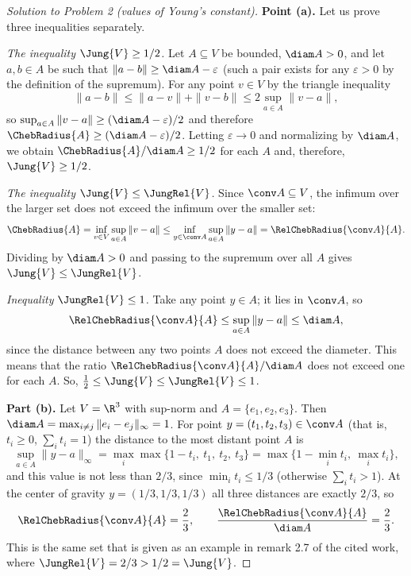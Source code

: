 \documentclass[a4paper,12pt]{report}
\begin{document}
\begin{proof}[Solution to Problem \textup{2} \textup{(}values of Young's constant\textup{)}]

\textbf{Point \textup{(a)}.} Let us prove three inequalities separately.

\textit{The inequality $\Jung{V} \ge 1/2$.} Let $A \subseteq V$ be bounded, $\diam A > 0$, and let $a, b \in A$ be such that $\|a - b\| \ge \diam A - \varepsilon$ \textup{(}such a pair exists for any $\varepsilon > 0$ by the definition of the supremum\textup{)}. For any point $v \in V$ by the triangle inequality
\[
\|a - b\| \le \|a - v\| + \|v - b\| \le 2 \sup_{a \in A} \|v - a\|,
\]
so $\sup_{a \in A} \|v - a\| \ge (\diam A - \varepsilon)/2$ and therefore $\ChebRadius{A} \ge (\diam A - \varepsilon)/2$. Letting $\varepsilon \to 0$ and normalizing by $\diam A$, we obtain $\ChebRadius{A}/\diam A \ge 1/2$ for each $A$ and, therefore, $\Jung{V} \ge 1/2$.

\textit{The inequality $\Jung{V} \le \JungRel{V}$.} Since $\conv A \subseteq V$, the infimum over the larger set does not exceed the infimum over the smaller set:
\[
\ChebRadius{A} = \inf_{v \in V} \sup_{a \in A} \|v - a\| \le \inf_{y \in \conv A} \sup_{a \in A} \|y - a\| = \RelChebRadius{\conv A}{A}.
\]
Dividing by $\diam A > 0$ and passing to the supremum over all $A$ gives $\Jung{V} \le \JungRel{V}$.

\textit{Inequality $\JungRel{V} \le 1$.} Take any point $y \in A$; it lies in $\conv A$, so
\[
\RelChebRadius{\conv A}{A} \le \sup_{a \in A} \|y - a\| \le \diam A,
\]
since the distance between any two points $A$ does not exceed the diameter. This means that the ratio $\RelChebRadius{\conv A}{A}/\diam A$ does not exceed one for each $A$. So, $\frac12 \le \Jung{V} \le \JungRel{V} \le 1$.

\textbf{Part \textup{(b)}.} Let $V = \R^3$ with sup-norm and $A = \{e_1, e_2, e_3\}$. Then $\diam A = \max_{i \ne j} \|e_i - e_j\|_\infty = 1$. For point $y = (t_1,t_2,t_3) \in \conv A$ \textup{(}that is, $t_i \ge 0$, $\sum_i t_i = 1$\textup{)} the distance to the most distant point $A$ is
\[
\sup_{a \in A} \|y - a\|_\infty = \max_i \max\bigl\{1 - t_i,\ t_1,\ t_2,\ t_3\bigr\} = \max\bigl\{1 - \min_i t_i,\ \max_i t_i\bigr\},
\]
and this value is not less than $2/3$, since $\min_i t_i \le 1/3$ \textup{(}otherwise $\sum_i t_i > 1$\textup{)}. At the center of gravity $y = (1/3,1/3,1/3)$ all three distances are exactly $2/3$, so
\[
\RelChebRadius{\conv A}{A} = \frac23, \qquad \frac{\RelChebRadius{\conv A}{A}}{\diam A} = \frac23.
\]
This is the same set that is given as an example in remark \textup{2.7} of the cited work, where $\JungRel{V} = 2/3 > 1/2 = \Jung{V}$.


\end{proof}
\end{document}
